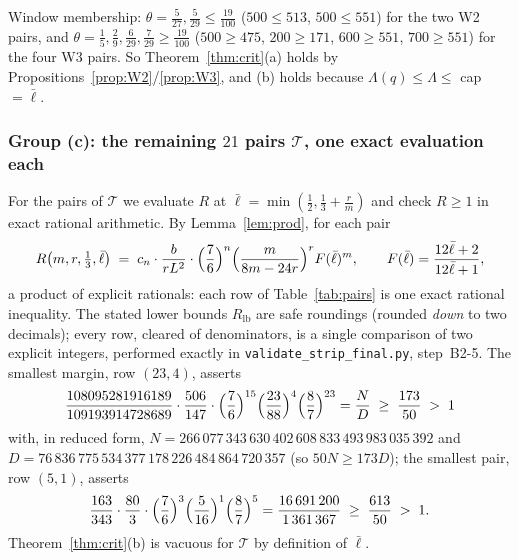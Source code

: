 \documentclass[11pt]{article}
\theoremstyle{remark}
\theoremstyle{plain}
\theoremstyle{plain}
\newcommand{\lbar}{\bar\ell}
\newcommand{\Lhat}{\widehat\Lambda}
\begin{document}
Window membership: $\theta=\tfrac5{27},\tfrac5{29}\le\tfrac{19}{100}$ ($500\le513$, $500\le551$) for the two W2 pairs, and $\theta=\tfrac15,\tfrac29,\tfrac6{29},\tfrac7{29}\ge\tfrac{19}{100}$ ($500\ge475$, $200\ge171$, $600\ge551$, $700\ge551$) for the four W3 pairs.  So Theorem~\ref{thm:crit}(a) holds by Propositions~\ref{prop:W2}/\ref{prop:W3}, and (b) holds because $\Lambda(q)\le\Lhat\le$ cap $=\lbar$.

\subsubsection{Group (c): the remaining $21$ pairs $\mathcal T$, one exact evaluation each}\label{sec:grpC}
For the pairs of $\mathcal T$ we evaluate $R$ at $\lbar=\min(\tfrac12,\tfrac13+\tfrac rm)$ and check $R\ge1$ in exact rational arithmetic.  By Lemma~\ref{lem:prod}, for each pair
\begin{equation}\label{eq:row}
        R\bigl(m,r,\tfrac13,\lbar\bigr)
        \;=\;c_n\cdot\frac b{rL^2}\cdot\Bigl(\frac76\Bigr)^{n}
        \Bigl(\frac{m}{8m-24r}\Bigr)^{r} F(\lbar)^{m},
        \qquad F(\lbar)=\frac{12\lbar+2}{12\lbar+1},
\end{equation}
a product of explicit rationals: each row of Table~\ref{tab:pairs} is one exact rational inequality.  The stated lower bounds $R_{\mathrm{lb}}$ are safe roundings (rounded \emph{down} to two decimals); every row, cleared of denominators, is a single comparison of two explicit integers, performed exactly in \texttt{validate\_strip\_final.py}, step~B2-5.  The smallest margin, row $(23,4)$, asserts
\[
        \frac{108095281916189}{109193914728689}\cdot\frac{506}{147}\cdot
        \Bigl(\frac76\Bigr)^{15}\Bigl(\frac{23}{88}\Bigr)^{4}
        \Bigl(\frac87\Bigr)^{23}
        =\frac ND\;\ge\;\frac{173}{50}\;>\;1
\]
with, in reduced form, $N=266\,077\,343\,630\,402\,608\,833\,493\,983\,035\,392$ and $D=76\,836\,775\,534\,377\,178\,226\,484\,864\,720\,357$ (so $50N\ge173D$); the smallest pair, row $(5,1)$, asserts
\[
        \frac{163}{343}\cdot\frac{80}{3}\cdot\Bigl(\frac76\Bigr)^{3}
        \Bigl(\frac5{16}\Bigr)^{1}\Bigl(\frac87\Bigr)^{5}
        =\frac{16\,691\,200}{1\,361\,367}\;\ge\;\frac{613}{50}\;>\;1 .
\]
Theorem~\ref{thm:crit}(b) is vacuous for $\mathcal T$ by definition of $\lbar$.
\end{document}
